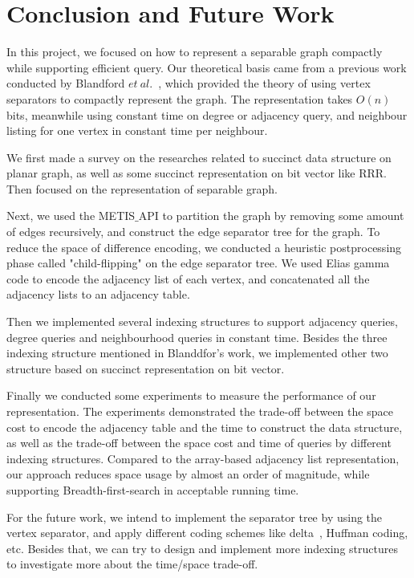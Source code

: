 \documentclass[12pt,glossary]{dalthesis}
\begin{document}
\chapter{Conclusion and Future Work}

In this project, we focused on how to represent a separable graph compactly while supporting efficient query. Our theoretical basis came from a previous work conducted by Blandford $et \ al.$~\cite{compact-representation}, which provided the theory of using vertex separators to compactly represent the graph. The representation takes $O(n)$ bits, meanwhile using constant time on degree or adjacency query, and neighbour listing for one vertex in constant time per neighbour. 

\bigskip
\bigskip

We first made a survey on the researches related to succinct data structure on planar graph, as well as some succinct representation on bit vector like RRR. Then focused on the representation of separable graph. 

\bigskip
\bigskip

Next, we used the METIS$\_$API to partition the graph by removing some amount of edges recursively, and construct the edge separator tree for the graph. To reduce the space of difference encoding, we conducted a heuristic postprocessing phase called "child-flipping" on the edge separator tree. We used Elias gamma code to encode the adjacency list of each vertex, and concatenated all the adjacency lists to an adjacency table.

\bigskip
\bigskip

Then we implemented several indexing structures to support adjacency queries, degree queries and neighbourhood queries in constant time. Besides the three indexing structure mentioned in Blanddfor's work, we implemented other two structure based on succinct representation on bit vector.

\bigskip
\bigskip

Finally we conducted some experiments to measure the performance of our representation. The experiments demonstrated the trade-off between the space cost to encode the adjacency table and the time to construct the data structure, as well as the trade-off between the space cost and time of queries by different indexing structures. Compared to the array-based adjacency list representation, our approach reduces space usage by almost an order of magnitude, while supporting Breadth-first-search in acceptable running time.

\bigskip
\bigskip

For the future work, we intend to implement the separator tree by using the vertex separator, and apply different coding schemes like delta~\cite{Elias}, Huffman coding, etc. Besides that, we can try to design and implement more indexing structures to investigate more about the time/space trade-off.
 


\end{document}
